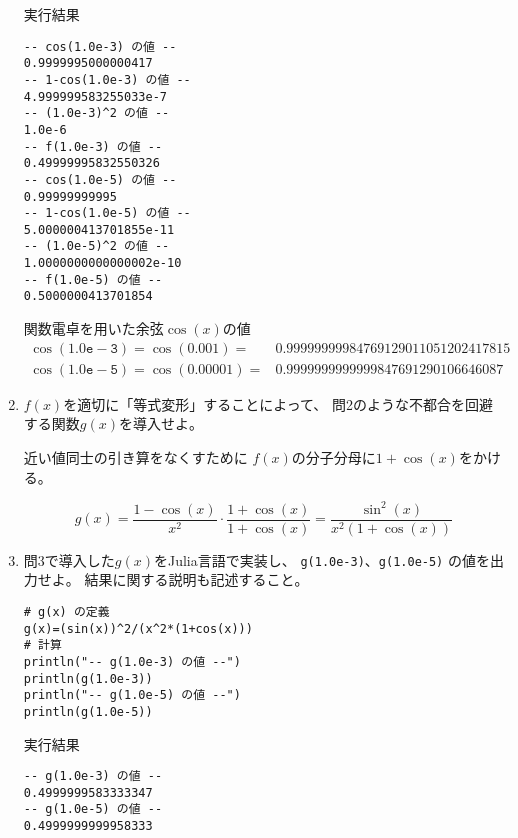 \documentclass[12pt,b5paper]{ltjsarticle}
\begin{document}
\begin{enumerate}
      実行結果
      \begin{lstlisting}
-- cos(1.0e-3) の値 --
0.9999995000000417
-- 1-cos(1.0e-3) の値 --
4.999999583255033e-7
-- (1.0e-3)^2 の値 --
1.0e-6
-- f(1.0e-3) の値 --
0.49999995832550326
-- cos(1.0e-5) の値 --
0.99999999995
-- 1-cos(1.0e-5) の値 --
5.000000413701855e-11
-- (1.0e-5)^2 の値 --
1.0000000000000002e-10
-- f(1.0e-5) の値 --
0.5000000413701854
      \end{lstlisting}

      関数電卓を用いた余弦$\cos{(x)}$の値
      \begin{align}
       \cos{(\mathtt{1.0e-3})} = \cos{(0.001)}
       =& 0.99999999984769129011051202417815\\
       \cos{(\mathtt{1.0e-5})} = \cos{(0.00001)}
       =& 0.9999999999999847691290106646087
      \end{align}


      \hrulefill

 \item
      $f(x)$を適切に「等式変形」することによって、
      問2のような不都合を回避する関数$g(x)$を導入せよ。


      \dotfill

      近い値同士の引き算をなくすために
      $f(x)$の分子分母に$1+\cos{(x)}$をかける。

      \begin{equation}
       g(x)
        = \frac{1-\cos{(x)}}{x^2}\cdot\frac{1+\cos{(x)}}{1+\cos{(x)}}
        = \frac{\sin^2{(x)}}{x^2(1+\cos{(x)})}
      \end{equation}

      \hrulefill

 \item
      問3で導入した$g(x)$をJulia言語で実装し、
      \texttt{g(1.0e-3)}、\texttt{g(1.0e-5)}
      の値を出力せよ。
      結果に関する説明も記述すること。

      \dotfill



      \begin{lstlisting}
# g(x) の定義
g(x)=(sin(x))^2/(x^2*(1+cos(x)))
# 計算
println("-- g(1.0e-3) の値 --")
println(g(1.0e-3))
println("-- g(1.0e-5) の値 --")
println(g(1.0e-5))
      \end{lstlisting}

      実行結果
      \begin{lstlisting}
-- g(1.0e-3) の値 --
0.4999999583333347
-- g(1.0e-5) の値 --
0.4999999999958333
      \end{lstlisting}


      \hrulefill


\end{enumerate}

\hrulefill
\end{document}
